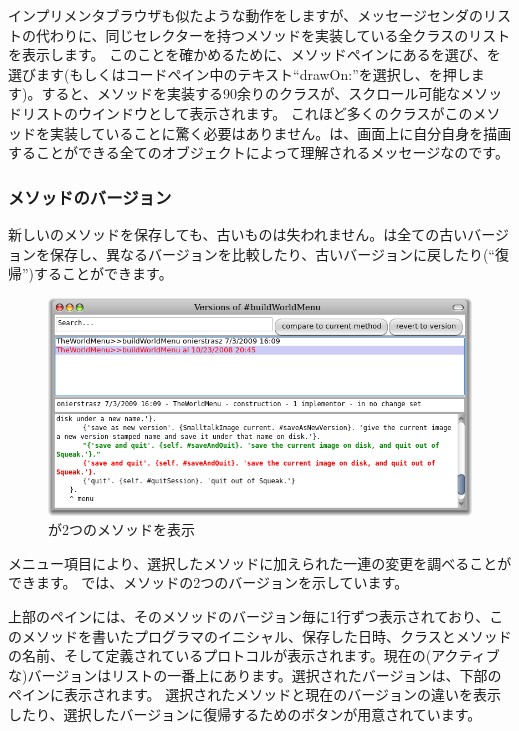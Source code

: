 \documentclass[a4paper,10pt,twoside]{book}
\begin{document}
インプリメンタブラウザも似たような動作をしますが、メッセージセンダのリストの代わりに、同じセレクターを持つメソッドを実装している全クラスのリストを表示します。
このことを確かめるために、メソッドペインにあるを選び、を選びます(もしくはコードペイン中のテキスト``drawOn:''を選択し、を押します)。すると、メソッドを実装する90余りのクラスが、スクロール可能なメソッドリストのウインドウとして表示されます。
これほど多くのクラスがこのメソッドを実装していることに驚く必要はありません。は、画面上に自分自身を描画することができる全てのオブジェクトによって理解されるメッセージなのです。

\subsubsection{メソッドのバージョン}

新しいのメソッドを保存しても、古いものは失われません。\pharo は全ての古いバージョンを保存し、異なるバージョンを比較したり、古いバージョンに戻したり(``復帰'')することができます。
\begin{figure}[btp]
   \centering
   \includegraphics[width=\textwidth]{Versions}
   \caption{が2つのメソッドを表示}
\end{figure}
メニュー項目により、選択したメソッドに加えられた一連の変更を調べることができます。
では、メソッドの2つのバージョンを示しています。

上部のペインには、そのメソッドのバージョン毎に1行ずつ表示されており、このメソッドを書いたプログラマのイニシャル、保存した日時、クラスとメソッドの名前、そして定義されているプロトコルが表示されます。現在の(アクティブな)バージョンはリストの一番上にあります。選択されたバージョンは、下部のペインに表示されます。
選択されたメソッドと現在のバージョンの違いを表示したり、選択したバージョンに復帰するためのボタンが用意されています。
\end{document}
